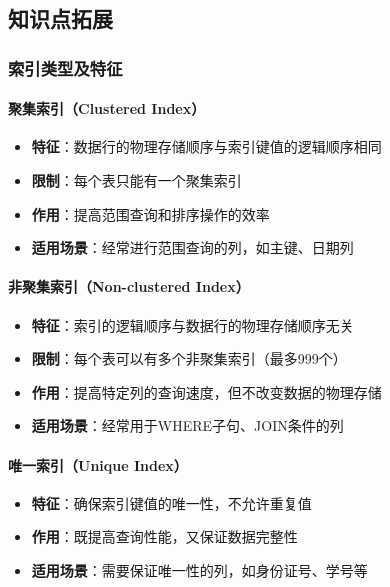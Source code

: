 \subsection{知识点拓展}

\subsubsection{索引类型及特征}

\paragraph{聚集索引（Clustered Index）}
\begin{itemize}
  \item \textbf{特征}：数据行的物理存储顺序与索引键值的逻辑顺序相同
  \item \textbf{限制}：每个表只能有一个聚集索引
  \item \textbf{作用}：提高范围查询和排序操作的效率
  \item \textbf{适用场景}：经常进行范围查询的列，如主键、日期列
\end{itemize}

\paragraph{非聚集索引（Non-clustered Index）}
\begin{itemize}
  \item \textbf{特征}：索引的逻辑顺序与数据行的物理存储顺序无关
  \item \textbf{限制}：每个表可以有多个非聚集索引（最多999个）
  \item \textbf{作用}：提高特定列的查询速度，但不改变数据的物理存储
  \item \textbf{适用场景}：经常用于WHERE子句、JOIN条件的列
\end{itemize}

\paragraph{唯一索引（Unique Index）}
\begin{itemize}
  \item \textbf{特征}：确保索引键值的唯一性，不允许重复值
  \item \textbf{作用}：既提高查询性能，又保证数据完整性
  \item \textbf{适用场景}：需要保证唯一性的列，如身份证号、学号等
\end{itemize}

